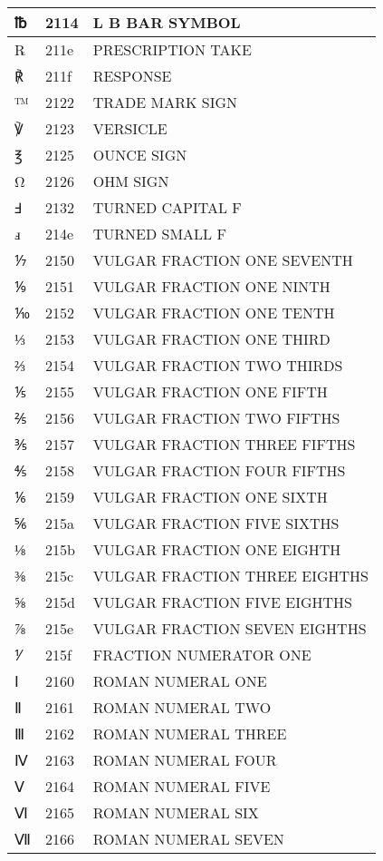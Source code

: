 \documentclass[12pt,letterpaper,openany]{book}
\begin{document}
\begin{center}
\begin{supertabular}{|m{0.25in}|m{0.5in}|m{4in}|}
			℔ & 2114 & L B BAR SYMBOL\\\hline
			℞ & 211e & PRESCRIPTION TAKE\\\hline
			℟ & 211f & RESPONSE\\\hline
			™ & 2122 & TRADE MARK SIGN\\\hline
			℣ & 2123 & VERSICLE\\\hline
			℥ & 2125 & OUNCE SIGN\\\hline
			Ω & 2126 & OHM SIGN\\\hline
			Ⅎ & 2132 & TURNED CAPITAL F\\\hline
			ⅎ & 214e & TURNED SMALL F\\\hline
			⅐ & 2150 & VULGAR FRACTION ONE SEVENTH\\\hline
			⅑ & 2151 & VULGAR FRACTION ONE NINTH\\\hline
			⅒ & 2152 & VULGAR FRACTION ONE TENTH\\\hline
			⅓ & 2153 & VULGAR FRACTION ONE THIRD\\\hline
			⅔ & 2154 & VULGAR FRACTION TWO THIRDS\\\hline
			⅕ & 2155 & VULGAR FRACTION ONE FIFTH\\\hline
			⅖ & 2156 & VULGAR FRACTION TWO FIFTHS\\\hline
			⅗ & 2157 & VULGAR FRACTION THREE FIFTHS\\\hline
			⅘ & 2158 & VULGAR FRACTION FOUR FIFTHS\\\hline
			⅙ & 2159 & VULGAR FRACTION ONE SIXTH\\\hline
			⅚ & 215a & VULGAR FRACTION FIVE SIXTHS\\\hline
			⅛ & 215b & VULGAR FRACTION ONE EIGHTH\\\hline
			⅜ & 215c & VULGAR FRACTION THREE EIGHTHS\\\hline
			⅝ & 215d & VULGAR FRACTION FIVE EIGHTHS\\\hline
			⅞ & 215e & VULGAR FRACTION SEVEN EIGHTHS\\\hline
			⅟ & 215f & FRACTION NUMERATOR ONE\\\hline
			Ⅰ & 2160 & ROMAN NUMERAL ONE\\\hline
			Ⅱ & 2161 & ROMAN NUMERAL TWO\\\hline
			Ⅲ & 2162 & ROMAN NUMERAL THREE\\\hline
			Ⅳ & 2163 & ROMAN NUMERAL FOUR\\\hline
			Ⅴ & 2164 & ROMAN NUMERAL FIVE\\\hline
			Ⅵ & 2165 & ROMAN NUMERAL SIX\\\hline
			Ⅶ & 2166 & ROMAN NUMERAL SEVEN\\\hline

\end{supertabular}
\end{center}
\end{document}
